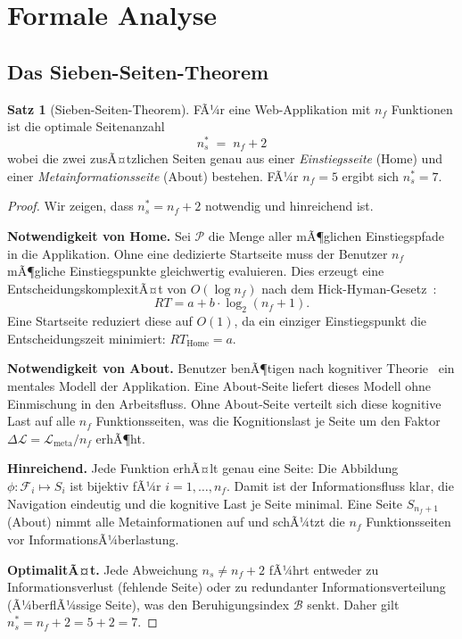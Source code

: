 ﻿\documentclass[a4paper,12pt]{article}
\theoremstyle{definition}
\newtheorem{satz}{Satz}
\begin{document}
\section{Formale Analyse}
\label{sec:formal}

\subsection{Das Sieben-Seiten-Theorem}

\begin{satz}[Sieben-Seiten-Theorem]
\label{satz:siebenSeiten}
    FÃ¼r eine Web-Applikation mit $n_f$ Funktionen ist die optimale Seitenanzahl
    \[
        n_s^* \;=\; n_f + 2
    \]
    wobei die zwei zusÃ¤tzlichen Seiten genau aus einer \emph{Einstiegsseite}
    (Home) und einer \emph{Metainformationsseite} (About) bestehen. FÃ¼r
    $n_f = 5$ ergibt sich $n_s^* = 7$.
\end{satz}

\begin{proof}
    Wir zeigen, dass $n_s^* = n_f + 2$ notwendig und hinreichend ist.

    \textbf{Notwendigkeit von Home.}
    Sei $\mathcal{P}$ die Menge aller mÃ¶glichen Einstiegspfade in die Applikation.
    Ohne eine dedizierte Startseite muss der Benutzer $n_f$ mÃ¶gliche Einstiegspunkte
    gleichwertig evaluieren. Dies erzeugt eine EntscheidungskomplexitÃ¤t von
    $O(\log n_f)$ nach dem Hick-Hyman-Gesetz~\cite{hick1952}:
    \[
        RT = a + b \cdot \log_2(n_f + 1).
    \]
    Eine Startseite reduziert diese auf $O(1)$, da ein einziger Einstiegspunkt
    die Entscheidungszeit minimiert: $RT_{\text{Home}} = a$.

    \textbf{Notwendigkeit von About.}
    Benutzer benÃ¶tigen nach kognitiver Theorie~\cite{norman1988} ein mentales Modell
    der Applikation. Eine About-Seite liefert dieses Modell ohne Einmischung in
    den Arbeitsfluss. Ohne About-Seite verteilt sich diese kognitive Last auf alle
    $n_f$ Funktionsseiten, was die Kognitionslast je Seite um den Faktor
    $\Delta\mathcal{L} = \mathcal{L}_{\text{meta}} / n_f$ erhÃ¶ht.

    \textbf{Hinreichend.}
    Jede Funktion erhÃ¤lt genau eine Seite: Die Abbildung
    $\phi: \mathcal{F}_i \mapsto S_i$ ist bijektiv fÃ¼r $i = 1, \ldots, n_f$.
    Damit ist der Informationsfluss klar, die Navigation eindeutig und die
    kognitive Last je Seite minimal. Eine Seite $S_{n_f + 1}$ (About) nimmt
    alle Metainformationen auf und schÃ¼tzt die $n_f$ Funktionsseiten vor
    InformationsÃ¼berlastung.

    \textbf{OptimalitÃ¤t.}
    Jede Abweichung $n_s \neq n_f + 2$ fÃ¼hrt entweder zu Informationsverlust
    (fehlende Seite) oder zu redundanter Informationsverteilung (Ã¼berflÃ¼ssige
    Seite), was den Beruhigungsindex $\mathcal{B}$ senkt. Daher gilt
    $n_s^* = n_f + 2 = 5 + 2 = 7$.
\end{proof}
\end{document}

